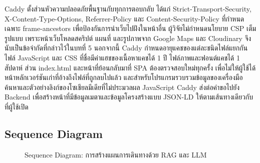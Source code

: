 Caddy ตั้งส่วนหัวความปลอดภัยพื้นฐานกับทุกการตอบกลับ ได้แก่ Strict-Transport-Security, X-Content-Type-Options, Referrer-Policy และ Content-Security-Policy ที่กำหนดเฉพาะ frame-ancestors เพื่อป้องกันการนำเว็บไปฝังในหน้าอื่น ผู้วิจัยไม่กำหนดนโยบาย CSP เต็มรูปแบบ เพราะหน้าเว็บโหลดสคริปต์ แผนที่ และรูปภาพจาก Google Maps และ Cloudinary จึงนับเป็นข้อจำกัดที่กล่าวไว้ในบทที่ 5 นอกจากนี้ Caddy กำหนดอายุแคชของแต่ละชนิดไฟล์แยกกัน ไฟล์ JavaScript และ CSS ที่ชื่อมีค่าแฮชของเนื้อหาแคชได้ 1 ปี ไฟล์ภาพและฟอนต์แคชได้ 1 สัปดาห์ ส่วน index.html และหน้าที่ย้อนกลับมาที่ SPA ต้องตรวจสอบใหม่ทุกครั้ง เพื่อไม่ให้ผู้ใช้ได้หน้าหลักเวอร์ชันเก่าที่อ้างถึงไฟล์ที่ถูกลบไปแล้ว และสำหรับโปรแกรมรวบรวมข้อมูลของเครื่องมือค้นหาและตัวอย่างลิงก์ของโซเชียลมีเดียที่ไม่ประมวลผล JavaScript Caddy ส่งต่อคำขอไปยัง Backend เพื่อสร้างหน้าที่มีข้อมูลเมตาและข้อมูลโครงสร้างแบบ JSON-LD ให้ตามเส้นทางเดียวกับที่ผู้ใช้เปิด

\subsection{Sequence Diagram}

\begin{figure}[H]
\centering
{}
\caption{Sequence Diagram: การสร้างแผนการเดินทางด้วย RAG และ LLM}
\label{fig:sequence_user}
\end{figure}

